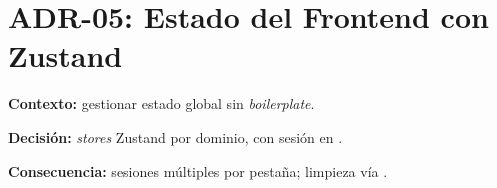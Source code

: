 \section{ADR-05: Estado del Frontend con Zustand}
\label{sec:adr_zustand}
\textbf{Contexto:} gestionar estado global sin \textit{boilerplate}.\par
\textbf{Decisión:} \textit{stores} Zustand por dominio, con sesión en .\par
\textbf{Consecuencia:} sesiones múltiples por pestaña; limpieza vía .

\clearpage
